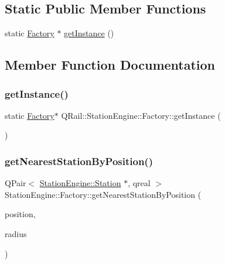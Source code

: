 \subsection*{Static Public Member Functions}
\begin{DoxyCompactItemize}
\item 
static \mbox{\hyperlink{classQRail_1_1StationEngine_1_1Factory}{Factory}} $\ast$ \mbox{\hyperlink{classQRail_1_1StationEngine_1_1Factory_ac66b314d8a7787511a6677a24ab321ff}{get\+Instance}} ()
\end{DoxyCompactItemize}


\subsection{Member Function Documentation}
\mbox{\label{classQRail_1_1StationEngine_1_1Factory_ac66b314d8a7787511a6677a24ab321ff}} 
\subsubsection{\texorpdfstring{getInstance()}{getInstance()}}
{\footnotesize\ttfamily static \mbox{\hyperlink{classQRail_1_1StationEngine_1_1Factory}{Factory}}$\ast$ Q\+Rail\+::\+Station\+Engine\+::\+Factory\+::get\+Instance (\begin{DoxyParamCaption}{ }\end{DoxyParamCaption})\hspace{0.3cm}{\ttfamily [static]}}

\mbox{\label{classQRail_1_1StationEngine_1_1Factory_a385cbfbc2697c39bd2c09b866bdfd4ac}} 
\subsubsection{\texorpdfstring{getNearestStationByPosition()}{getNearestStationByPosition()}}
{\footnotesize\ttfamily Q\+Pair$<$ \mbox{\hyperlink{classQRail_1_1StationEngine_1_1Station}{Station\+Engine\+::\+Station}} $\ast$, qreal $>$ Station\+Engine\+::\+Factory\+::get\+Nearest\+Station\+By\+Position (\begin{DoxyParamCaption}\item[{const Q\+Geo\+Coordinate \&}]{position,  }\item[{const qreal}]{radius }\end{DoxyParamCaption})}

